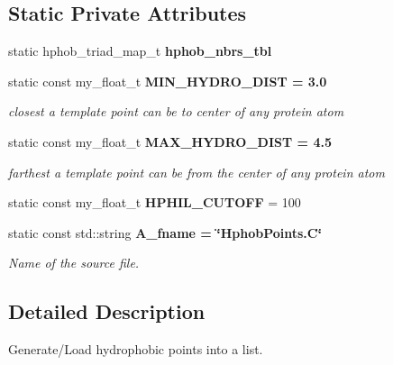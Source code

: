 \subsection*{Static Private Attributes}
\begin{CompactItemize}
\item 
static hphob\_\-triad\_\-map\_\-t \textbf{hphob\_\-nbrs\_\-tbl}\label{classSimSite3D_1_1HphobPoints_d3f1bba26bfaeb8e8db124fea2c9a646}

\item 
static const my\_\-float\_\-t \bf{MIN\_\-HYDRO\_\-DIST} = 3.0\label{classSimSite3D_1_1HphobPoints_5c0af7f8cf548ab24531b2fc4d154c56}

\begin{CompactList}\small\item\em closest a template point can be to center of any protein atom \item\end{CompactList}\item 
static const my\_\-float\_\-t \bf{MAX\_\-HYDRO\_\-DIST} = 4.5\label{classSimSite3D_1_1HphobPoints_39c4760c7bb2cc947393f964a14682cd}

\begin{CompactList}\small\item\em farthest a template point can be from the center of any protein atom \item\end{CompactList}\item 
static const my\_\-float\_\-t \textbf{HPHIL\_\-CUTOFF} = 100\label{classSimSite3D_1_1HphobPoints_f28d83c9e72324ac0c9e1879a83eb071}

\item 
static const std::string \bf{A\_\-fname} = \char`\"{}Hphob\-Points.C\char`\"{}\label{classSimSite3D_1_1HphobPoints_df2c547cffadaeb60355a7695a1a330b}

\begin{CompactList}\small\item\em Name of the source file. \item\end{CompactList}\end{CompactItemize}


\subsection{Detailed Description}
Generate/Load hydrophobic points into a list. 



